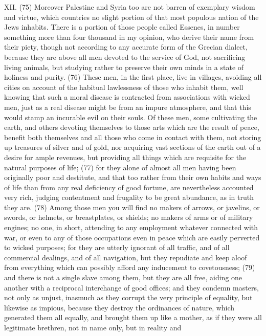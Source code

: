 XII. (75) Moreover Palestine and Syria too are not barren of exemplary wisdom and virtue, which
countries no slight portion of that most populous nation of the Jews inhabits. There is a portion of
those people called Essenes, in number something more than four thousand in my opinion, who
derive their name from their piety, though not according to any accurate form of the Grecian
dialect, because they are above all men devoted to the service of God, not sacrificing living
animals, but studying rather to preserve their own minds in a state of holiness and purity. (76)
These men, in the first place, live in villages, avoiding all cities on account of the habitual
lawlessness of those who inhabit them, well knowing that such a moral disease is contracted from
associations with wicked men, just as a real disease might be from an impure atmosphere, and
that this would stamp an incurable evil on their souls. Of these men, some cultivating the earth, and
others devoting themselves to those arts which are the result of peace, benefit both themselves
and all those who come in contact with them, not storing up treasures of silver and of gold, nor
acquiring vast sections of the earth out of a desire for ample revenues, but providing all things
which are requisite for the natural purposes of life; (77) for they alone of almost all men having
been originally poor and destitute, and that too rather from their own habits and ways of life than
from any real deficiency of good fortune, are nevertheless accounted very rich, judging
contentment and frugality to be great abundance, as in truth they are. (78) Among those men you
will find no makers of arrows, or javelins, or swords, or helmets, or breastplates, or shields; no
makers of arms or of military engines; no one, in short, attending to any employment whatever
connected with war, or even to any of those occupations even in peace which are easily perverted
to wicked purposes; for they are utterly ignorant of all traffic, and of all commercial dealings, and of
all navigation, but they repudiate and keep aloof from everything which can possibly afford any
inducement to covetousness; (79) and there is not a single slave among them, but they are all free,
aiding one another with a reciprocal interchange of good offices; and they condemn masters, not
only as unjust, inasmuch as they corrupt the very principle of equality, but likewise as impious,
because they destroy the ordinances of nature, which generated them all equally, and brought
them up like a mother, as if they were all legitimate brethren, not in name only, but in reality and
